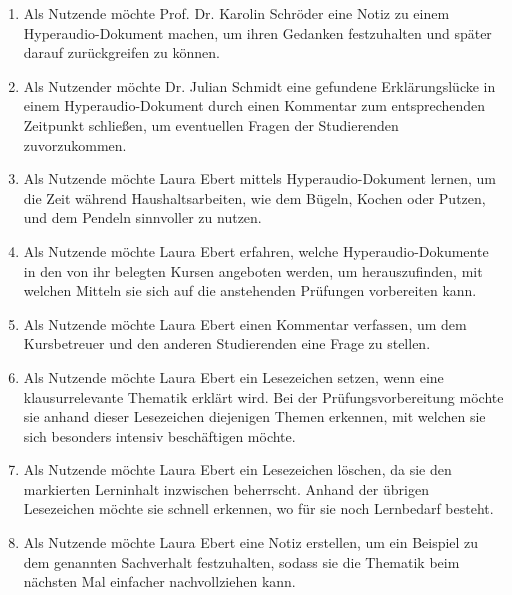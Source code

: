 \begin{enumerate}[label=US-\arabic*:,ref=US-\arabic*]
\item \label{US-Notiz-L} Als Nutzende möchte Prof. Dr. Karolin Schröder eine Notiz zu einem Hyperaudio-Dokument machen, um ihren Gedanken festzuhalten und später darauf zurückgreifen zu können.

\item \label{US-Kommentar-L} Als Nutzender möchte Dr. Julian Schmidt eine gefundene Erklärungslücke in einem Hyperaudio-Dokument durch einen Kommentar zum entsprechenden Zeitpunkt schließen, um eventuellen Fragen der Studierenden zuvorzukommen.


\item \label{US-Zeit} Als Nutzende möchte Laura Ebert mittels Hyperaudio-Dokument lernen, um die Zeit während Haushaltsarbeiten, wie dem Bügeln, Kochen oder Putzen, und dem Pendeln sinnvoller zu nutzen.

\item \label{US-Uebersicht-Kurse} Als Nutzende möchte Laura Ebert erfahren, welche Hyperaudio-Dokumente in den von ihr belegten Kursen angeboten werden, um herauszufinden, mit welchen Mitteln sie sich auf die anstehenden Prüfungen vorbereiten kann.

\item \label{US-Kommentar-S} Als Nutzende möchte Laura Ebert einen Kommentar verfassen, um dem Kursbetreuer und den anderen Studierenden eine Frage zu stellen.

\item \label{US-Lesezeichen} Als Nutzende möchte Laura Ebert ein Lesezeichen setzen, wenn eine klausurrelevante Thematik erklärt wird. Bei der Prüfungsvorbereitung möchte sie anhand dieser Lesezeichen diejenigen Themen erkennen, mit welchen sie sich besonders intensiv beschäftigen möchte.

\item \label{US-Lesezeichen-Loeschen} Als Nutzende möchte Laura Ebert ein Lesezeichen löschen, da sie den markierten Lerninhalt inzwischen beherrscht. Anhand der übrigen Lesezeichen möchte sie schnell erkennen, wo für sie noch Lernbedarf besteht.

\item \label{US-Notiz-S} Als Nutzende möchte Laura Ebert eine Notiz erstellen, um ein Beispiel zu dem genannten Sachverhalt festzuhalten, sodass sie die Thematik beim nächsten Mal einfacher nachvollziehen kann.


\end{enumerate}
